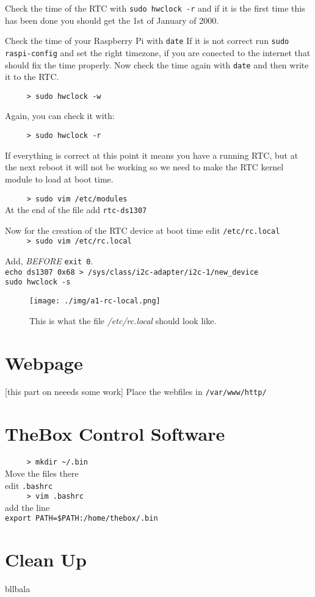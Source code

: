 \begin{enumerate}
Check the time of the RTC with \verb=sudo hwclock -r= and if it is the first time this has been done you should get the 1st of January of 2000.

Check the time of your Raspberry Pi with \verb=date= If it is not correct run \verb=sudo raspi-config= and set the right timezone, if you are conected
to the internet that should fix the time properly. Now check the time again with \verb=date= and then write it to the RTC.

\verb=     > sudo hwclock -w= 

Again, you can check it with:

\verb=     > sudo hwclock -r=

If everything is correct at this point it means you have a running RTC, but at the next reboot it will not be working so we need to make the RTC kernel
module to load at boot time.

\verb=     > sudo vim /etc/modules=\\
At the end of the file add \verb=rtc-ds1307=

Now for the creation of the RTC device at boot time edit \verb=/etc/rc.local=\\

\verb=     > sudo vim /etc/rc.local=

Add, \emph{BEFORE} \verb=exit 0=.\\
\verb=echo ds1307 0x68 > /sys/class/i2c-adapter/i2c-1/new_device=\\
\verb=sudo hwclock -s=

\begin{figure}[h!]
 \centering
 \texttt{[image: ./img/a1-rc-local.png]}
 \caption{This is what the file \emph{/etc/rc.local} should look like.}
 \label{fig:rc-local}
\end{figure}

\end{enumerate}

\section{Webpage} [this part on neeeds some work]
Place the webfiles in \verb=/var/www/http/=
\section{TheBox Control Software}
\verb=     > mkdir ~/.bin=\\
Move the files there\\
edit \verb=.bashrc=\\
\verb=     > vim .bashrc=\\
add the line\\
\verb+export PATH=$PATH:/home/thebox/.bin+
\section{Clean Up}
bllbala